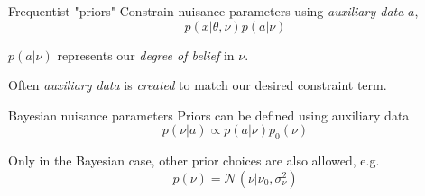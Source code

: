 \documentclass[
aspectratio=169,
14pt,
professionalfonts
]{beamer}
\begin{document}
    
    
\begin{frame}{Frequentist "priors"}
    Constrain nuisance parameters using \textit{auxiliary data} $a$,
    $$p(x| \theta, \nu) p(a| \nu)$$
    
    $p(a| \nu)$ represents our \textit{degree of belief} in $\nu$.
    
    \vspace{0.5cm}
    
    Often \textit{auxiliary data} is \textit{created} to match our desired constraint term.
    \end{frame}
    
\begin{frame}{Bayesian nuisance parameters}
    Priors can be defined using auxiliary data
    $$p(\nu|a) \propto p(a|\nu) p_0(\nu)$$
    
    Only in the Bayesian case, other prior choices are also allowed, e.g.
    $$ p(\nu) = \mathcal{N}(\nu | \nu_0, \sigma_\nu^2)$$
    
\end{frame}
    
\end{document}
